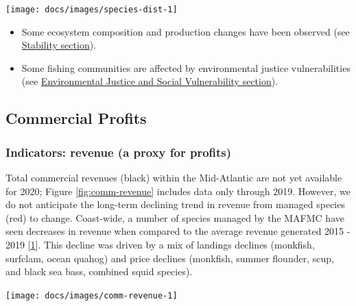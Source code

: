 \documentclass[
  10pt,
]{article}
\providecommand{\tightlist}{%
  \setlength{\itemsep}{0pt}\setlength{\parskip}{0pt}}
\let\origfigure\figure
\let\endorigfigure\endfigure
\renewenvironment{figure}[1][2] {
    \expandafter\origfigure\expandafter[H]
} {
    \endorigfigure
}
\begin{document}
\begin{figure}

{\centering \texttt{[image: docs/images/species-dist-1]} 

}

\caption{Aggregate species distribution metrics for species in the Northeast Large Marine Ecosystem.}\label{fig:species-dist}
\end{figure}

\begin{itemize}
\tightlist
\item
  Some ecosystem composition and production changes have been observed
  (see \protect\hyperlink{stability}{Stability section}).
\item
  Some fishing communities are affected by environmental justice
  vulnerabilities (see
  \protect\hyperlink{social-vulnerability}{Environmental Justice and
  Social Vulnerability section}).
\end{itemize}

\hypertarget{commercial-profits}{%
\subsection{Commercial Profits}\label{commercial-profits}}

\hypertarget{indicators-revenue-a-proxy-for-profits}{%
\subsubsection{Indicators: revenue (a proxy for
profits)}\label{indicators-revenue-a-proxy-for-profits}}

Total commercial revenues (black) within the Mid-Atlantic are not yet
available for 2020; Figure \ref{fig:comm-revenue} includes data only
through 2019. However, we do not anticipate the long-term declining
trend in revenue from managed species (red) to change. Coast-wide, a
number of species managed by the MAFMC have seen decreases in revenue
when compared to the average revenue generated 2015 - 2019
{[}\protect\hyperlink{ref-thunberg_northeast_2021}{1}{]}. This decline
was driven by a mix of landings declines (monkfish, surfclam, ocean
quahog) and price declines (monkfish, summer flounder, scup, and black
sea bass, combined squid species).

\begin{figure}

{\centering \texttt{[image: docs/images/comm-revenue-1]} 

}

\caption{Revenue through 2019 for the for the Mid-Atlantic region: total (black) and from MAFMC managed species (red).}\label{fig:comm-revenue}
\end{figure}
\end{document}
